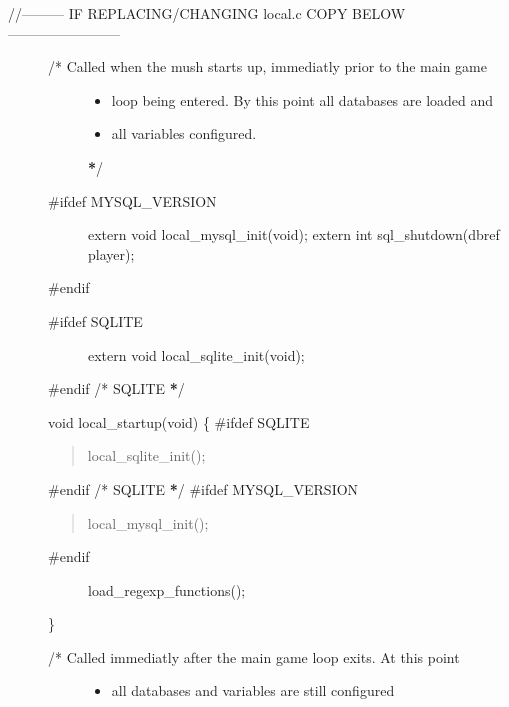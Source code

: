 \documentclass[letterpaper,10pt,english]{sphinxmanual}
\begin{document}
\begin{description}
\item[{//———\textendash{} IF REPLACING/CHANGING local.c COPY BELOW ————————\textendash{}}] \leavevmode\begin{description}
\item[{/* Called when the mush starts up, immediatly prior to the main game}] \leavevmode\begin{itemize}
\item {} 
\sphinxAtStartPar
loop being entered. By this point all databases are loaded and

\item {} 
\sphinxAtStartPar
all variables configured.

\end{itemize}

\sphinxAtStartPar
{\color{red}\bfseries{}*}/

\item[{\#ifdef MYSQL\_VERSION}] \leavevmode
\sphinxAtStartPar
extern void local\_mysql\_init(void);
extern int sql\_shutdown(dbref player);

\end{description}

\sphinxAtStartPar
\#endif
\begin{description}
\item[{\#ifdef SQLITE}] \leavevmode
\sphinxAtStartPar
extern void local\_sqlite\_init(void);

\end{description}

\sphinxAtStartPar
\#endif /* SQLITE {\color{red}\bfseries{}*}/

\sphinxAtStartPar
void local\_startup(void) \{
\#ifdef SQLITE
\begin{quote}

\sphinxAtStartPar
local\_sqlite\_init();
\end{quote}

\sphinxAtStartPar
\#endif /* SQLITE {\color{red}\bfseries{}*}/
\#ifdef MYSQL\_VERSION
\begin{quote}

\sphinxAtStartPar
local\_mysql\_init();
\end{quote}
\begin{description}
\item[{\#endif}] \leavevmode
\sphinxAtStartPar
load\_regexp\_functions();

\end{description}

\sphinxAtStartPar
\}
\begin{description}
\item[{/* Called immediatly after the main game loop exits. At this point}] \leavevmode\begin{itemize}
\item {} 
\sphinxAtStartPar
all databases and variables are still configured


\end{itemize}
\end{description}
\end{description}
\end{document}
